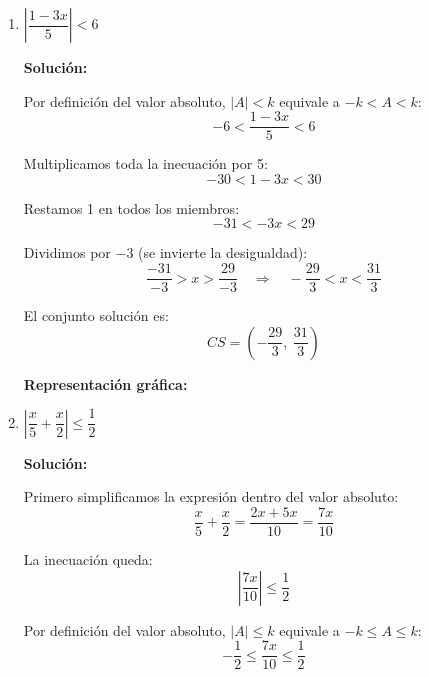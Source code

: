 \documentclass[12pt]{article}
\newcommand{\solucion}{%
    \vspace{0.8em}%
    \textbf{Solución:}%
}
\begin{document}
\begin{enumerate}[label=\alph*.-]
    \newpage
    \item $\left|\dfrac{1 - 3x}{5}\right| < 6$

    \solucion

    Por definición del valor absoluto, $|A| < k$ equivale a $-k < A < k$:
    \[
    -6 < \dfrac{1 - 3x}{5} < 6
    \]

    Multiplicamos toda la inecuación por 5:
    \[
    -30 < 1 - 3x < 30
    \]

    Restamos 1 en todos los miembros:
    \[
    -31 < -3x < 29
    \]

    Dividimos por $-3$ (se invierte la desigualdad):
    \[
    \dfrac{-31}{-3} > x > \dfrac{29}{-3} \quad \Rightarrow \quad -\dfrac{29}{3} < x < \dfrac{31}{3}
    \]

    El conjunto solución es:
    \[
    \boxed{CS = \left(-\dfrac{29}{3},\ \dfrac{31}{3}\right)}
    \]

    \textbf{Representación gráfica:}

    \begin{center}
    \end{center}

    \newpage
    \item $\left|\dfrac{x}{5} + \dfrac{x}{2}\right| \leq \dfrac{1}{2}$

    \solucion

    Primero simplificamos la expresión dentro del valor absoluto:
    \[
    \dfrac{x}{5} + \dfrac{x}{2} = \dfrac{2x + 5x}{10} = \dfrac{7x}{10}
    \]

    La inecuación queda:
    \[
    \left|\dfrac{7x}{10}\right| \leq \dfrac{1}{2}
    \]

    Por definición del valor absoluto, $|A| \leq k$ equivale a $-k \leq A \leq k$:
    \[
    -\dfrac{1}{2} \leq \dfrac{7x}{10} \leq \dfrac{1}{2}
    \]


\end{enumerate}
\end{document}
